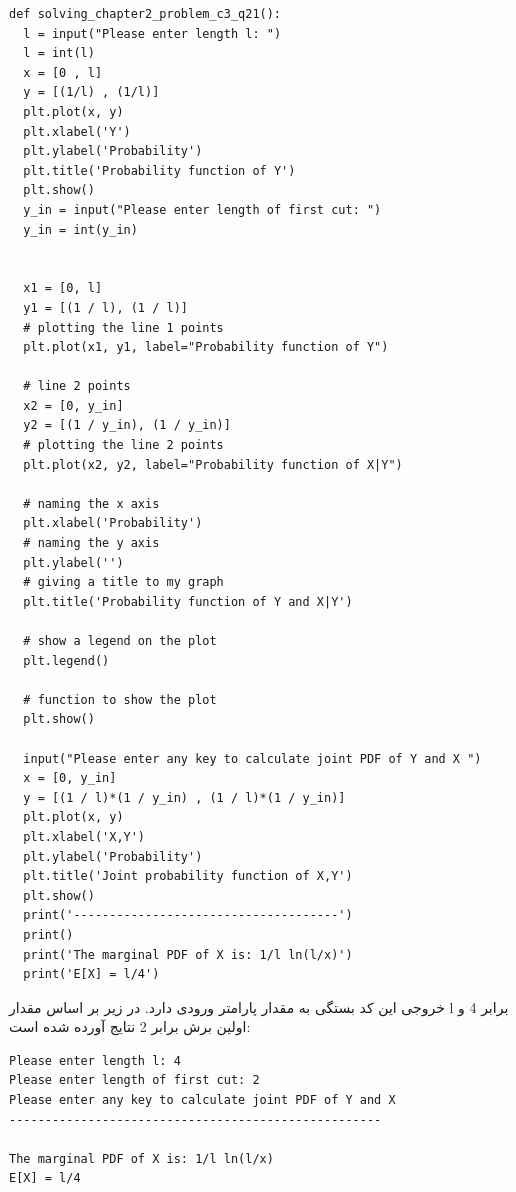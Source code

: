 \documentclass[a4paper,14pt]{article}
\begin{document}
\fontsize{11}{11}\selectfont
\begin{latin}
	\begin{lstlisting}
def solving_chapter2_problem_c3_q21():
  l = input("Please enter length l: ")
  l = int(l)
  x = [0 , l]
  y = [(1/l) , (1/l)]
  plt.plot(x, y)
  plt.xlabel('Y')
  plt.ylabel('Probability')
  plt.title('Probability function of Y')
  plt.show()
  y_in = input("Please enter length of first cut: ")
  y_in = int(y_in)


  x1 = [0, l]
  y1 = [(1 / l), (1 / l)]
  # plotting the line 1 points
  plt.plot(x1, y1, label="Probability function of Y")

  # line 2 points
  x2 = [0, y_in]
  y2 = [(1 / y_in), (1 / y_in)]
  # plotting the line 2 points
  plt.plot(x2, y2, label="Probability function of X|Y")

  # naming the x axis
  plt.xlabel('Probability')
  # naming the y axis
  plt.ylabel('')
  # giving a title to my graph
  plt.title('Probability function of Y and X|Y')

  # show a legend on the plot
  plt.legend()

  # function to show the plot
  plt.show()

  input("Please enter any key to calculate joint PDF of Y and X ")
  x = [0, y_in]
  y = [(1 / l)*(1 / y_in) , (1 / l)*(1 / y_in)]
  plt.plot(x, y)
  plt.xlabel('X,Y')
  plt.ylabel('Probability')
  plt.title('Joint probability function of X,Y')
  plt.show()
  print('-------------------------------------')
  print()
  print('The marginal PDF of X is: 1/l ln(l/x)')
  print('E[X] = l/4')
	\end{lstlisting}
\end{latin}
\fontsize{14}{14}\selectfont


خروجی این کد بستگی به مقدار پارامتر ورودی دارد. در زیر بر اساس مقدار l برابر 4 و اولین برش برابر 2 نتایج آورده شده است:\\


\begin{latin}
	\begin{lstlisting}
Please enter length l: 4
Please enter length of first cut: 2
Please enter any key to calculate joint PDF of Y and X 
----------------------------------------------------

The marginal PDF of X is: 1/l ln(l/x)
E[X] = l/4
	\end{lstlisting}
\end{latin}
\end{document}
